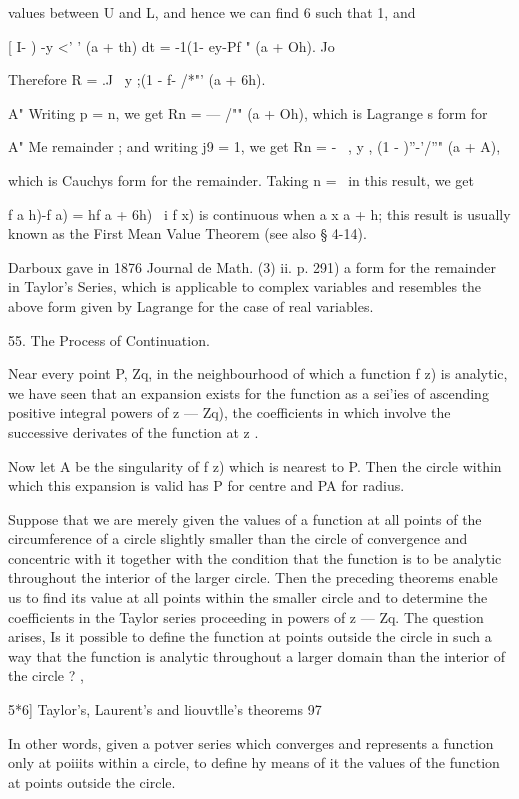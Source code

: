 {{values between U and L, and hence we can find 6 such that 1, and

[ I- ) -y <' ' (a + th) dt = -1(1- ey-Pf " (a + Oh). Jo

Therefore R = .J \ y ;(1 - f- /*"' (a + 6h).

A" Writing p = n, we get Rn = — /"" (a + Oh), which is Lagrange s form
for

A" Me remainder ; and writing j9 = 1, we get Rn = - \ , y , (1 -
)''-'/''" (a + A),

which is Cauchys form for the remainder. Taking n = \ in this result,
we get

f a h)-f a) = hf a + 6h) \ i f x) is continuous when a x a + h; this
result is usually known as the First Mean Value Theorem (see also §
4-14).

Darboux gave in 1876 Journal de Math. (3) ii. p. 291) a form for the
remainder in Taylor's Series, which is applicable to complex variables
and resembles the above form given by Lagrange for the case of real
variables.

55. The Process of Continuation.

Near every point P, Zq, in the neighbourhood of which a function f z)
is analytic, we have seen that an expansion exists for the function as
a sei'ies of ascending positive integral powers of z — Zq), the
coefficients in which involve the successive derivates of the function
at z .

Now let A be the singularity of f z) which is nearest to P. Then the
circle within which this expansion is valid has P for centre and PA
for radius.

Suppose that we are merely given the values of a function at all
points of the circumference of a circle slightly smaller than the
circle of convergence and concentric with it together with the
condition that the function is to be analytic throughout the interior
of the larger circle. Then the preceding theorems enable us to find
its value at all points within the smaller circle and to determine the
coefficients in the Taylor series proceeding in powers of z — Zq. The
question arises, Is it possible to define the function at points
outside the circle in such a way that the function is analytic
throughout a larger domain than the interior of the circle ? ,



5*6] Taylor's, Laurent's and liouvtlle's theorems 97

In other words, given a potver series which converges and represents a
function only at poiiits within a circle, to define hy means of it the
values of the function at points outside the circle.

}}
